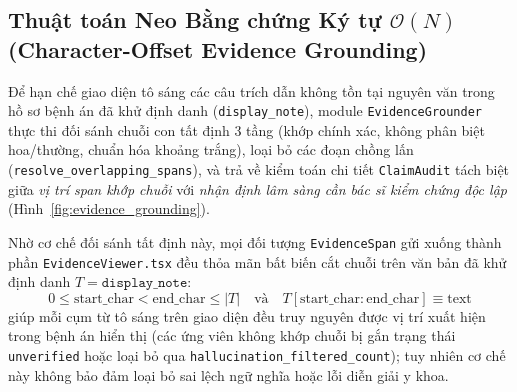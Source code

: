 \subsection{Thuật toán Neo Bằng chứng Ký tự $\mathcal{O}(N)$ (Character-Offset Evidence Grounding)}
Để hạn chế giao diện tô sáng các câu trích dẫn không tồn tại nguyên văn trong hồ sơ bệnh án đã khử định danh (\texttt{display\_note}), module \texttt{EvidenceGrounder} thực thi đối sánh chuỗi con tất định 3 tầng (khớp chính xác, không phân biệt hoa/thường, chuẩn hóa khoảng trắng), loại bỏ các đoạn chồng lấn (\texttt{resolve\_overlapping\_spans}), và trả về kiểm toán chi tiết \texttt{ClaimAudit} tách biệt giữa \textit{vị trí span khớp chuỗi} với \textit{nhận định lâm sàng cần bác sĩ kiểm chứng độc lập} (Hình~\ref{fig:evidence_grounding}).



Nhờ cơ chế đối sánh tất định này, mọi đối tượng \texttt{EvidenceSpan} gửi xuống thành phần \texttt{EvidenceViewer.tsx} đều thỏa mãn bất biến cắt chuỗi trên văn bản đã khử định danh $T = \texttt{display\_note}$:
\begin{equation}
    0 \le \text{start\_char} < \text{end\_char} \le |T| \quad \text{và} \quad T[\text{start\_char}:\text{end\_char}] \equiv \text{text}
\end{equation}
giúp mỗi cụm từ tô sáng trên giao diện đều truy nguyên được vị trí xuất hiện trong bệnh án hiển thị (các ứng viên không khớp chuỗi bị gắn trạng thái \texttt{unverified} hoặc loại bỏ qua \texttt{hallucination\_filtered\_count}); tuy nhiên cơ chế này không bảo đảm loại bỏ sai lệch ngữ nghĩa hoặc lỗi diễn giải y khoa.
